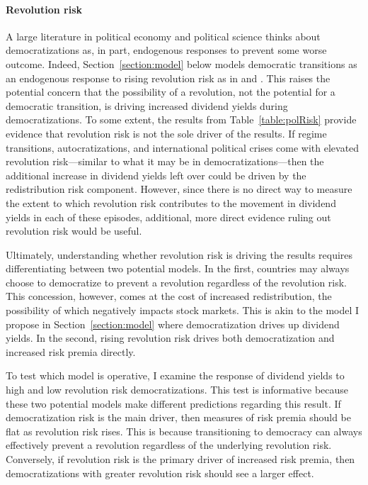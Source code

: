 

\paragraph{Revolution risk}
\label{par:rev_risk_beg}
A large literature in political economy and political science thinks about democratizations as, in part,  endogenous responses to prevent some worse outcome. Indeed, Section~\ref{section:model} below models democratic transitions as an endogenous response to rising revolution risk as in \cite{Boix2003} and \cite{Acemoglu2006}.  This raises the potential concern that the possibility of a revolution, not the potential for a democratic transition, is driving increased dividend yields during democratizations. To some extent, the results from Table~\ref{table:polRisk} provide evidence that revolution risk is not the sole driver of the results. If regime transitions, autocratizations, and international political crises come with elevated revolution risk---similar to what it may be in democratizations---then the additional increase in dividend yields left over could be driven by the redistribution risk component. However, since there is no direct way to measure the extent to which revolution risk contributes to the movement in dividend yields in each of these episodes, additional, more direct evidence ruling out revolution risk would be useful.

Ultimately, understanding whether revolution risk is driving the results requires differentiating between two potential models. In the first, countries may always choose to democratize to prevent a revolution regardless of the revolution risk. This concession, however, comes at the cost of increased redistribution, the possibility of which negatively impacts stock markets. This is akin to the model I propose in Section~\ref{section:model} where democratization drives up dividend yields. In the second, rising revolution risk drives both democratization and increased risk premia directly.

To test which model is operative, I examine the response of dividend yields to high and low revolution risk democratizations. This test is informative because these two potential models make different predictions regarding this result. If democratization risk is the main driver, then measures of risk premia should be flat as revolution risk rises.  This is because transitioning to democracy can always effectively prevent a revolution regardless of the underlying revolution risk. Conversely, if revolution risk is the primary driver of increased risk premia, then democratizations with greater revolution risk should see a larger effect.


